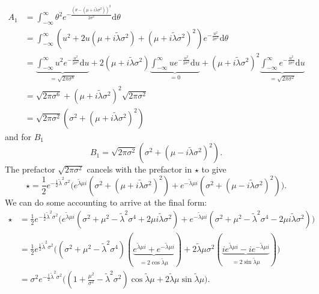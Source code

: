 \documentclass[]{report}
\begin{document}
\begin{align}
    A_1 &= \int_{-\infty}^{\infty}\theta^2e^{-\frac{(\theta - (\mu + i \tilde{\lambda} \sigma^2))^2}{2\sigma^2}} \text{d}\theta\\
    &= \int_{-\infty}^{\infty}(u^2 + 2u(\mu + i \tilde{\lambda} \sigma^2) + (\mu + i \tilde{\lambda} \sigma^2)^2)e^{-\frac{u^2}{2\sigma^2}} \text{d}\theta\\
    &=
    \underbrace{\int_{-\infty}^{\infty}u^2 e^{-\frac{u^2}{2\sigma^2}} \text{d}u}_{=\sqrt{2\pi\sigma^6}} +
    2(\mu + i \tilde{\lambda} \sigma^2) \underbrace{\int_{-\infty}^{\infty} ue^{-\frac{u^2}{2\sigma^2}} \text{d}u}_{=0} +
    (\mu + i \tilde{\lambda} \sigma^2)^2 \underbrace{\int_{-\infty}^{\infty}e^{-\frac{u^2}{2\sigma^2}} \text{d}u}_{=\sqrt{2\pi\sigma^2}}\\
    &= \sqrt{2\pi\sigma^6} + (\mu + i \tilde{\lambda} \sigma^2)^2 \sqrt{2\pi\sigma^2}\\
    &= \sqrt{2\pi\sigma^2} (\sigma^2 + (\mu + i \tilde{\lambda} \sigma^2)^2)
\end{align}
and for $B_1$
\begin{equation}
    B_1 = \sqrt{2\pi\sigma^2} (\sigma^2 + (\mu - i \tilde{\lambda} \sigma^2)^2).
\end{equation}
The prefactor $\sqrt{2\pi\sigma^2}$ cancels with the prefactor in $\star$ to give
\begin{equation}
    \star = \frac{1}{2}e^{-\frac{1}{2}\tilde{\lambda}^2\sigma^2}
    \Big(
        e^{\tilde{\lambda} \mu i}(\sigma^2 + (\mu + i \tilde{\lambda} \sigma^2)^2) +
        e^{-\tilde{\lambda} \mu i}(\sigma^2 + (\mu - i \tilde{\lambda} \sigma^2)^2)
    \Big).
\end{equation}
We can do some accounting to arrive at the final form:
\begin{align}
    \star &= \frac{1}{2}e^{-\frac{1}{2}\tilde{\lambda}^2\sigma^2}
    \Big(
        e^{\tilde{\lambda} \mu i}(\sigma^2 + \mu^2 - \tilde{\lambda}^2\sigma^4 + 2\mu i \tilde{\lambda} \sigma^2) +
        e^{-\tilde{\lambda} \mu i}(\sigma^2 + \mu^2 - \tilde{\lambda}^2\sigma^4 - 2\mu i \tilde{\lambda} \sigma^2)
    \Big)\\
    &= \frac{1}{2}e^{\frac{1}{2}\tilde{\lambda}^2\sigma^2}
    \Big(
        (\sigma^2 + \mu^2 - \tilde{\lambda}^2\sigma^4)(\underbrace{e^{\tilde{\lambda} \mu i} + e^{-\tilde{\lambda} \mu i}}_{=2\cos{\tilde{\lambda} \mu}})
        + 2\tilde{\lambda} \mu \sigma^2(\underbrace{i e^{\tilde{\lambda} \mu i} - ie^{-\tilde{\lambda} \mu i}}_{=2\sin{\tilde{\lambda} \mu}})
    \Big)\\
    &= \sigma^2 e^{-\frac{1}{2}\tilde{\lambda}^2\sigma^2}\Big((1 + \frac{\mu^2}{\sigma^2} - \tilde{\lambda}^2\sigma^2)\cos{\tilde{\lambda} \mu} + 2\tilde{\lambda} \mu \sin{\tilde{\lambda} \mu}\Big).
\end{align}
\end{document}
